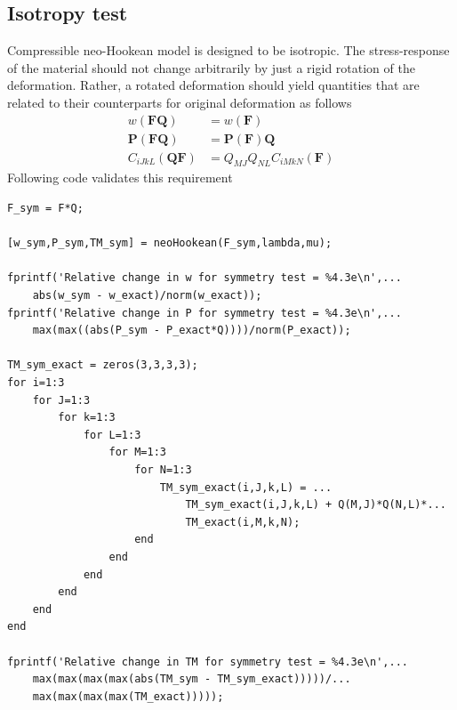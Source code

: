 \message{ !name(p2.tex)}\documentclass[../main.tex]{subfiles}
\begin{document}
\subsection{Isotropy test}
\label{sec:isotropy}
Compressible neo-Hookean model is designed to be isotropic. The
stress-response of the material should not change arbitrarily by just
a rigid rotation of the deformation. Rather, a rotated deformation
should yield quantities that are related to their counterparts for
original deformation as follows
\begin{align*}
  w(\mathbf{FQ}) &= w(\mathbf{F})\\
  \mathbf{P}(\mathbf{FQ}) &= \mathbf{P}(\mathbf{F})\mathbf{Q}\\
  C_{iJkL}(\mathbf{QF}) &= Q_{MJ}Q_{NL}C_{iMkN}(\mathbf{F})
\end{align*}
Following code validates this requirement
\begin{lstlisting}[style=Matlab-editor]
%% Symmetry test
F_sym = F*Q;

[w_sym,P_sym,TM_sym] = neoHookean(F_sym,lambda,mu);

fprintf('Relative change in w for symmetry test = %4.3e\n',...
    abs(w_sym - w_exact)/norm(w_exact));
fprintf('Relative change in P for symmetry test = %4.3e\n',...
    max(max((abs(P_sym - P_exact*Q))))/norm(P_exact));

TM_sym_exact = zeros(3,3,3,3);
for i=1:3
    for J=1:3
        for k=1:3
            for L=1:3
                for M=1:3
                    for N=1:3
                        TM_sym_exact(i,J,k,L) = ...
                            TM_sym_exact(i,J,k,L) + Q(M,J)*Q(N,L)*...
                            TM_exact(i,M,k,N);
                    end
                end
            end
        end
    end
end

fprintf('Relative change in TM for symmetry test = %4.3e\n',...
    max(max(max(max(abs(TM_sym - TM_sym_exact)))))/...
    max(max(max(max(TM_exact)))));
\end{lstlisting}
\end{document}
